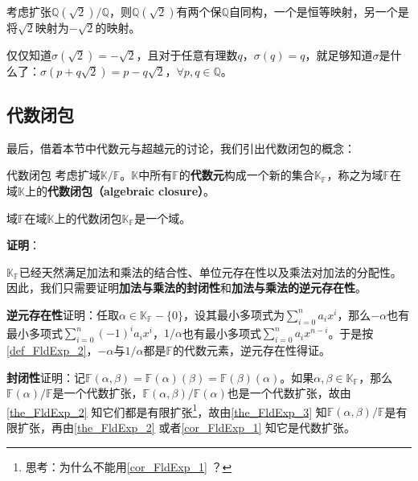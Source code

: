 \begin{example}{}
考虑扩张$\mathbb{Q}(\sqrt{2})/\mathbb{Q}$，则$\mathbb{Q}(\sqrt{2})$有两个保$\mathbb{Q}$自同构，一个是恒等映射，另一个是将$\sqrt{2}$映射为$-\sqrt{2}$的映射。

仅仅知道$\sigma(\sqrt{2})=-\sqrt{2}$，且对于任意有理数$q$，$\sigma(q)=q$，就足够知道$\sigma$是什么了：$\sigma(p+q\sqrt{2})=p-q\sqrt{2}$，$\forall p, q\in\mathbb{Q}$。
\end{example}








\subsection{代数闭包}

最后，借着本节中代数元与超越元的讨论，我们引出代数闭包的概念：


\begin{definition}{代数闭包}
考虑扩域$\mathbb{K}/\mathbb{F}$。$\mathbb{K}$中所有$\mathbb{F}$的\textbf{代数元}构成一个新的集合$\mathbb{K}_{\mathbb{F}}$，称之为域$\mathbb{F}$在域$\mathbb{K}$上的\textbf{代数闭包（algebraic closure）}。
\end{definition}

\begin{theorem}{}

域$\mathbb{F}$在域$\mathbb{K}$上的代数闭包$\mathbb{K}_{\mathbb{F}}$是一个域。

\end{theorem}

\textbf{证明}：

$\mathbb{K}_{\mathbb{F}}$已经天然满足加法和乘法的结合性、单位元存在性以及乘法对加法的分配性。因此，我们只需要证明\textbf{加法与乘法的封闭性}和\textbf{加法与乘法的逆元存在性}。

\textbf{逆元存在性}证明：任取$\alpha\in\mathbb{K}_{\mathbb{F}}-\{0\}$，设其最小多项式为$\sum_{i=0}^{n}a_ix^i$，那么$-\alpha$也有最小多项式$\sum_{i=0}^n(-1)^ia_ix^i$，$1/\alpha$也有最小多项式$\sum_{i=0}^na_ix^{n-i}$。于是按\autoref{def_FldExp_2}，$-\alpha$与$1/\alpha$都是$\mathbb{F}$的代数元素，逆元存在性得证。

\textbf{封闭性}证明：记$\mathbb{F}(\alpha, \beta)=\mathbb{F}(\alpha)(\beta)=\mathbb{F}(\beta)(\alpha)$。如果$\alpha,\beta\in\mathbb{K}_{\mathbb{F}}$，那么$\mathbb{F}(\alpha)/\mathbb{F}$是一个代数扩张，$\mathbb{F}(\alpha, \beta)/\mathbb{F}(\alpha)$也是一个代数扩张，故由\autoref{the_FldExp_2} 知它们都是有限扩张\footnote{思考：为什么不能用\autoref{cor_FldExp_1} ？}，故由\autoref{the_FldExp_3} 知$\mathbb{F}(\alpha, \beta)/\mathbb{F}$是有限扩张，再由\autoref{the_FldExp_2} 或者\autoref{cor_FldExp_1} 知它是代数扩张。

